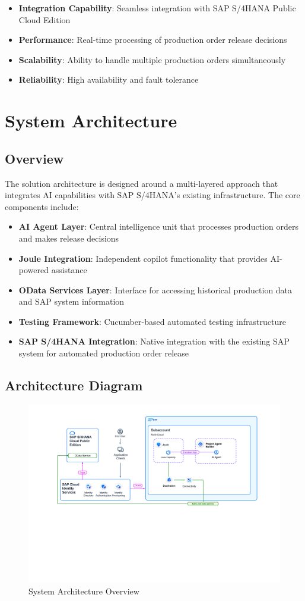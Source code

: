 \begin{itemize}
    \item \textbf{Integration Capability}: Seamless integration with SAP S/4HANA Public Cloud Edition
    \item \textbf{Performance}: Real-time processing of production order release decisions
    \item \textbf{Scalability}: Ability to handle multiple production orders simultaneously
    \item \textbf{Reliability}: High availability and fault tolerance
\end{itemize}

\section{System Architecture}

\subsection{Overview}

The solution architecture is designed around a multi-layered approach that integrates AI capabilities with SAP S/4HANA's existing infrastructure. The core components include:

\begin{itemize}
    \item \textbf{AI Agent Layer}: Central intelligence unit that processes production orders and makes release decisions
    \item \textbf{Joule Integration}: Independent copilot functionality that provides AI-powered assistance
    \item \textbf{OData Services Layer}: Interface for accessing historical production data and SAP system information
    \item \textbf{Testing Framework}: Cucumber-based automated testing infrastructure
    \item \textbf{SAP S/4HANA Integration}: Native integration with the existing SAP system for automated production order release
\end{itemize}

\subsection{Architecture Diagram}

\begin{figure}[h]
\centering
\includegraphics[width=1.0\textwidth]{graphic/IDP-highlevel.pdf}
\caption{System Architecture Overview}
\label{fig:system-architecture}
\end{figure}

